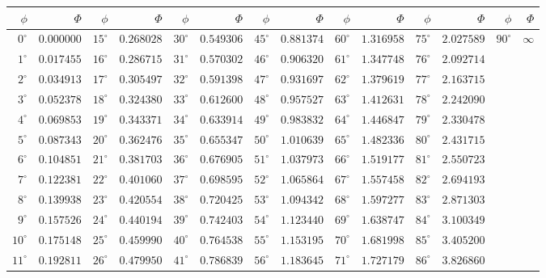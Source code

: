 \documentclass[11pt,a4paper]{article}
\theoremstyle{definition}
\begin{document}
\begin{center}
\small
\begin{tabular}{r|r|r|r|r|r|r|r|r|r|r|r|r|r}
\hline
$\phi$ & $\Phi$ & $\phi$ & $\Phi$ & $\phi$ & $\Phi$ & $\phi$ & $\Phi$ & $\phi$ & $\Phi$ & $\phi$ & $\Phi$ & $\phi$ & $\Phi$ \\
\hline
$0^\circ$ & $0.000000$ & $15^\circ$ & $0.268028$ & $30^\circ$ & $0.549306$ & $45^\circ$ & $0.881374$ & $60^\circ$ & $1.316958$ & $75^\circ$ & $2.027589$ & $90^\circ$ & $\infty$ \\
$1^\circ$ & $0.017455$ & $16^\circ$ & $0.286715$ & $31^\circ$ & $0.570302$ & $46^\circ$ & $0.906320$ & $61^\circ$ & $1.347748$ & $76^\circ$ & $2.092714$ & & \\
$2^\circ$ & $0.034913$ & $17^\circ$ & $0.305497$ & $32^\circ$ & $0.591398$ & $47^\circ$ & $0.931697$ & $62^\circ$ & $1.379619$ & $77^\circ$ & $2.163715$ & & \\
$3^\circ$ & $0.052378$ & $18^\circ$ & $0.324380$ & $33^\circ$ & $0.612600$ & $48^\circ$ & $0.957527$ & $63^\circ$ & $1.412631$ & $78^\circ$ & $2.242090$ & & \\
$4^\circ$ & $0.069853$ & $19^\circ$ & $0.343371$ & $34^\circ$ & $0.633914$ & $49^\circ$ & $0.983832$ & $64^\circ$ & $1.446847$ & $79^\circ$ & $2.330478$ & & \\
$5^\circ$ & $0.087343$ & $20^\circ$ & $0.362476$ & $35^\circ$ & $0.655347$ & $50^\circ$ & $1.010639$ & $65^\circ$ & $1.482336$ & $80^\circ$ & $2.431715$ & & \\
$6^\circ$ & $0.104851$ & $21^\circ$ & $0.381703$ & $36^\circ$ & $0.676905$ & $51^\circ$ & $1.037973$ & $66^\circ$ & $1.519177$ & $81^\circ$ & $2.550723$ & & \\
$7^\circ$ & $0.122381$ & $22^\circ$ & $0.401060$ & $37^\circ$ & $0.698595$ & $52^\circ$ & $1.065864$ & $67^\circ$ & $1.557458$ & $82^\circ$ & $2.694193$ & & \\
$8^\circ$ & $0.139938$ & $23^\circ$ & $0.420554$ & $38^\circ$ & $0.720425$ & $53^\circ$ & $1.094342$ & $68^\circ$ & $1.597277$ & $83^\circ$ & $2.871303$ & & \\
$9^\circ$ & $0.157526$ & $24^\circ$ & $0.440194$ & $39^\circ$ & $0.742403$ & $54^\circ$ & $1.123440$ & $69^\circ$ & $1.638747$ & $84^\circ$ & $3.100349$ & & \\
$10^\circ$ & $0.175148$ & $25^\circ$ & $0.459990$ & $40^\circ$ & $0.764538$ & $55^\circ$ & $1.153195$ & $70^\circ$ & $1.681998$ & $85^\circ$ & $3.405200$ & & \\
$11^\circ$ & $0.192811$ & $26^\circ$ & $0.479950$ & $41^\circ$ & $0.786839$ & $56^\circ$ & $1.183645$ & $71^\circ$ & $1.727179$ & $86^\circ$ & $3.826860$ & & \\

\end{tabular}
\end{center}
\end{document}

